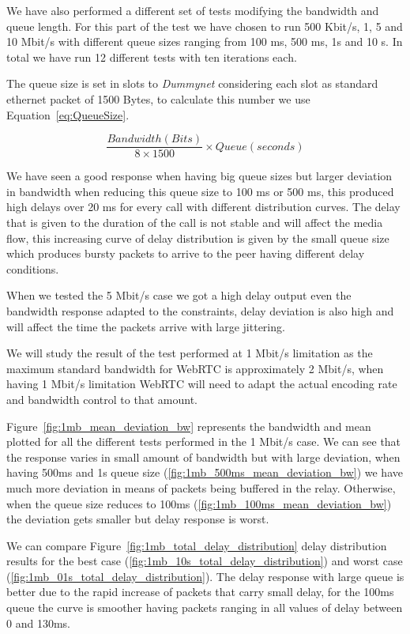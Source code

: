 We have also performed a different set of tests modifying the bandwidth and queue length. For this part of the test we have chosen to run 500 Kbit/s, 1, 5 and 10 Mbit/s with different queue sizes ranging from 100 ms, 500 ms, 1s and 10 s. In total we have run 12 different tests with ten iterations each.

The queue size is set in slots to {\it Dummynet} considering each slot as standard ethernet packet of 1500 Bytes, to calculate this number we use Equation~\ref{eq:QueueSize}.

\begin{equation}
	\frac{Bandwidth (Bits)}{8 \times 1500} \times Queue (seconds)
	\label{eq:QueueSize}
\end{equation}

We have seen a good response when having big queue sizes but larger deviation in bandwidth when reducing this queue size to 100 ms or 500 ms, this produced high delays over 20 ms for every call with different distribution curves. The delay that is given to the duration of the call is not stable and will affect the media flow, this increasing curve of delay distribution is given by the small queue size which produces bursty packets to arrive to the peer having different delay conditions.

When we tested the 5 Mbit/s case we got a high delay output even the bandwidth response adapted to the constraints, delay deviation is also high and will affect the time the packets arrive with large jittering.

We will study the result of the test performed at 1 Mbit/s limitation as the maximum standard bandwidth for WebRTC is approximately 2 Mbit/s, when having 1 Mbit/s limitation WebRTC will need to adapt the actual encoding rate and bandwidth control to that amount.

Figure~\ref{fig:1mb_mean_deviation_bw} represents the bandwidth and mean plotted for all the different tests performed in the 1 Mbit/s case. We can see that the response varies in small amount of bandwidth but with large deviation, when having 500ms and 1s queue size (\ref{fig:1mb_500ms_mean_deviation_bw}) we have much more deviation in means of packets being buffered in the relay. Otherwise, when the queue size reduces to 100ms (\ref{fig:1mb_100ms_mean_deviation_bw}) the deviation gets smaller but delay response is worst.

We can compare Figure~\ref{fig:1mb_total_delay_distribution} delay distribution results for the best case (\ref{fig:1mb_10s_total_delay_distribution}) and worst case (\ref{fig:1mb_01s_total_delay_distribution}). The delay response with large queue is better due to the rapid increase of packets that carry small delay, for the 100ms queue the curve is smoother having packets ranging in all values of delay between 0 and 130ms.

